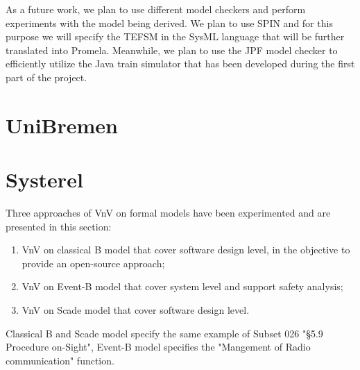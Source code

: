 \documentclass{template/openetcs_article}
\begin{document}
As a future work, we plan to use different model checkers and perform experiments with the model being derived. We plan to use SPIN and for this purpose we will specify the TEFSM in the SysML language that will be further translated into Promela. Meanwhile, we plan to use the JPF model checker to efficiently utilize the Java train simulator that has been developed during the first part of the project.

\newpage



\newpage

\section{UniBremen}



\newpage

\section{Systerel}

Three approaches of VnV  on formal models have been experimented and are presented in this section:

\begin{enumerate}
\item VnV on classical B  model that cover software design level, in the objective to provide an open-source approach;
\item VnV on Event-B model that cover system level and support safety analysis;
\item VnV on Scade model that cover software design level.
\end{enumerate}

Classical B and Scade model specify the same example of Subset 026 "§5.9 Procedure on-Sight", Event-B model specifies the "Mangement of Radio communication" function.







\nocite{*}

%



%
\end{document}
